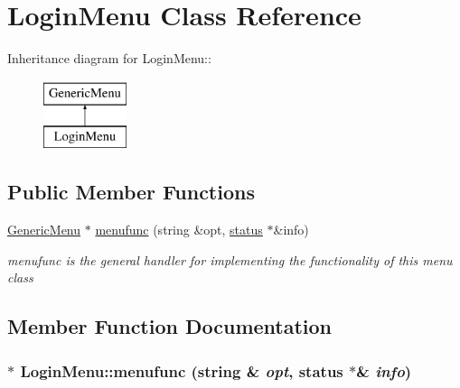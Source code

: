 \hypertarget{classLoginMenu}{
\section{LoginMenu Class Reference}
\label{classLoginMenu}
}
Inheritance diagram for LoginMenu::\begin{figure}[H]
\begin{center}
\leavevmode
\includegraphics[height=2cm]{classLoginMenu}
\end{center}
\end{figure}
\subsection*{Public Member Functions}
\begin{DoxyCompactItemize}
\item 
\hyperlink{classGenericMenu}{GenericMenu} $\ast$ \hyperlink{classLoginMenu_a2f391af29531a557e0547294e97132fe}{menufunc} (string \&opt, \hyperlink{classstatus}{status} $\ast$\&info)
\begin{DoxyCompactList}\small\item\em menufunc is the general handler for implementing the functionality of this menu class \item\end{DoxyCompactList}\end{DoxyCompactItemize}


\subsection{Member Function Documentation}
\hypertarget{classLoginMenu_a2f391af29531a557e0547294e97132fe}{
\subsubsection[{menufunc}]{ $\ast$ LoginMenu::menufunc (string \& {\em opt}, \/  {\bf status} $\ast$\& {\em info})}}
\label{classLoginMenu_a2f391af29531a557e0547294e97132fe}



